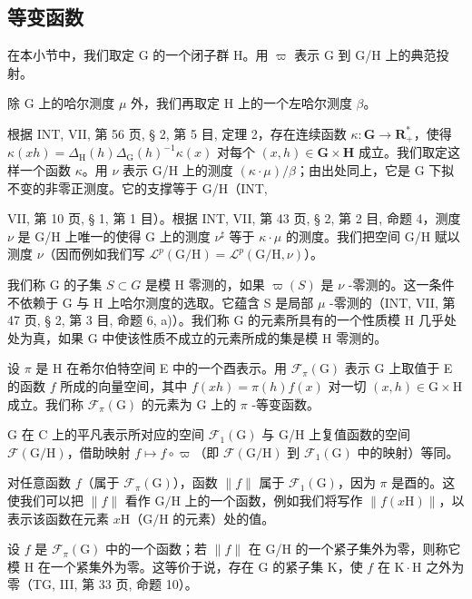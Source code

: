 \subsection{等变函数}

在本小节中，我们取定 G 的一个闭子群 H。用 \(\varpi\) 表示 G 到 G/H 上的典范投射。

除 G 上的哈尔测度 \(\mu\) 外，我们再取定 H 上的一个左哈尔测度 \(\beta\)。

根据 INT, VII, 第 56 页, § 2, 第 5 目, 定理 2，存在连续函数 \(\kappa\colon\mathbf{G}\to\mathbf{R}_{+}^{*}\)，使得 \(\kappa(xh)=\Delta_{\mathrm{H}}(h)\Delta_{\mathrm{G}}(h)^{-1}\kappa(x)\) 对每个 \((x,h)\in\mathbf{G}\times\mathbf{H}\) 成立。我们取定这样一个函数 \(\kappa\)。用 \(\nu\) 表示 G/H 上的测度 \((\kappa\cdot\mu)/\beta\)；由出处同上，它是 G 下拟不变的非零正测度。它的支撑等于 G/H（INT,

VII, 第 10 页, § 1, 第 1 目）。根据 INT, VII, 第 43 页, § 2, 第 2 目, 命题 4，测度 \(\nu\) 是 G/H 上唯一的使得 G 上的测度 \(\nu^{\sharp}\) 等于 \(\kappa \cdot \mu\) 的测度。我们把空间 G/H 赋以测度 \(\nu\)（因而例如我们写 \(\mathcal{L}^{p}(\mathrm{G / H}) = \mathcal{L}^{p}(\mathrm{G / H},\nu)\)）。

 我们称 G 的子集 \(S \subset G\) 是模 H 零测的，如果 \(\varpi(S)\) 是 \(\nu\) -零测的。这一条件不依赖于 G 与 H 上哈尔测度的选取。它蕴含 S 是局部 \(\mu\) -零测的（INT, VII, 第 47 页, § 2, 第 3 目, 命题 6, a)）。我们称 G 的元素所具有的一个性质模 H 几乎处处为真，如果 G 中使该性质不成立的元素所成的集是模 H 零测的。

设 \(\pi\) 是 H 在希尔伯特空间 E 中的一个酉表示。用 \(\mathcal{F}_{\pi}(\mathrm{G})\) 表示 G 上取值于 E 的函数 \(f\) 所成的向量空间，其中 \(f(xh) = \pi(h)f(x)\) 对一切 \((x,h) \in \mathrm{G} \times \mathrm{H}\) 成立。我们称 \(\mathcal{F}_{\pi}(\mathrm{G})\) 的元素为 G 上的 \(\pi\) -等变函数。

G 在 C 上的平凡表示所对应的空间 \(\mathcal{F}_{1}(\mathrm{G})\) 与 G/H 上复值函数的空间 \(\mathcal{F}(\mathrm{G / H})\)，借助映射 \(f\mapsto f\circ \varpi\)（即 \(\mathcal{F}(\mathrm{G / H})\) 到 \(\mathcal{F}_1(\mathrm{G})\) 中的映射）等同。

对任意函数 \(f\)（属于 \(\mathcal{F}_{\pi}(\mathrm{G})\)），函数 \(\|f\|\) 属于 \(\mathcal{F}_{1}(\mathrm{G})\)，因为 \(\pi\) 是酉的。这使我们可以把 \(\|f\|\) 看作 \(\mathrm{G/H}\) 上的一个函数，例如我们将写作 \(\|f(x\mathrm{H})\|\)，以表示该函数在元素 \(x\mathrm{H}\)（\(\mathrm{G/H}\) 的元素）处的值。

设 \(f\) 是 \(\mathcal{F}_{\pi}(\mathrm{G})\) 中的一个函数；若 \(\|f\|\) 在 G/H 的一个紧子集外为零，则称它模 H 在一个紧集外为零。这等价于说，存在 G 的紧子集 K，使 \(f\) 在 \(\mathrm{K} \cdot \mathrm{H}\) 之外为零（TG, III, 第 33 页, 命题 10）。

